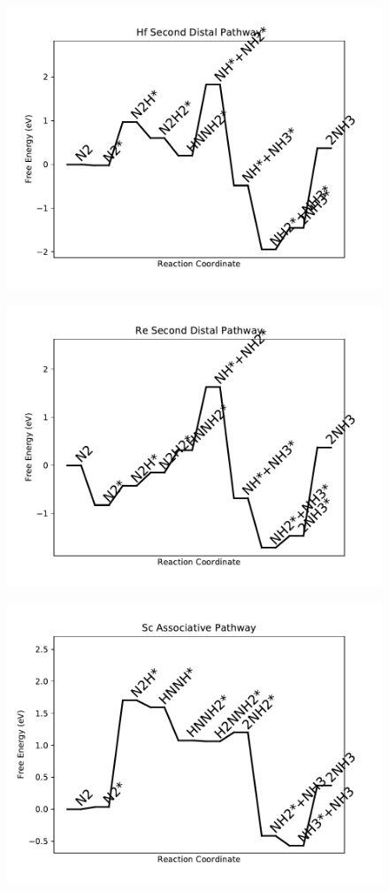 \begin{figure}
\centering
\includegraphics[width=0.8\linewidth]{data/plots/Hf_distal_2.pdf}
\end{figure}

\begin{figure}
\centering
\includegraphics[width=0.8\linewidth]{data/plots/Re_distal_2.pdf}
\end{figure}

\begin{figure}
\centering
\includegraphics[width=0.8\linewidth]{data/plots/Sc_associative.pdf}
\end{figure}

